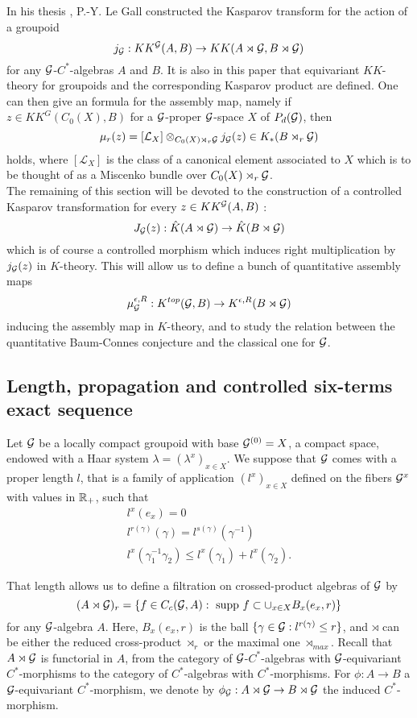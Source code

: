 In his thesis \cite{LeGall}, P.-Y. Le Gall constructed the Kasparov transform for the action of a groupoid
\[j_\mathcal G : KK^\mathcal G(A,B)\rightarrow KK(A\rtimes \mathcal G,B\rtimes \mathcal G)\]
for any $\mathcal G$-$C^*$-algebras $A$ and $B$. It is also in this paper that equivariant $KK$-theory for groupoids and the corresponding Kasparov product are defined. One can then give an formula for the assembly map, namely if $z\in KK^G(C_0(X),B)$ for a $\mathcal G$-proper $\mathcal G$-space $X$ of $P_d(\mathcal G)$, then
\[\mu_r(z)=[\mathcal L_X]\otimes_{C_0(X)\rtimes_r \mathcal G} j_\mathcal G(z) \in K_*(B\rtimes_r \mathcal G) \]
holds, where $[\mathcal L_X]$ is the class of a canonical element associated to $X$ which is to be thought of as a Miscenko bundle over $C_0(X)\rtimes_r \mathcal G$.\\

The remaining of this section will be devoted to the construction of a controlled Kasparov transformation for every $z\in KK^\mathcal G(A,B)$ :
\[J_\mathcal G(z) : \hat K(A\rtimes \mathcal G)\rightarrow \hat K(B\rtimes \mathcal G)\] 
which is of course a controlled morphism which induces right multiplication by $j_\mathcal G(z)$ in $K$-theory. This will allow us to define a bunch of quantitative assembly maps
\[\mu_\mathcal G^{\epsilon, R}: K^{top}(\mathcal G,B)\rightarrow K^{\epsilon,R}(B\rtimes \mathcal G)\]
inducing the assembly map in $K$-theory, and to study the relation between the quantitative Baum-Connes conjecture and the classical one for $\mathcal G$.

\subsection{Length, propagation and controlled six-terms exact sequence}

Let $\mathcal G$ be a locally compact groupoid with base $\mathcal G^{(0)}=X$, a compact space, endowed with a Haar system $\lambda=(\lambda^x)_{x\in X}$. We suppose that $\mathcal G$ comes with a proper length $l$, that is a family of application $(l^x)_{x\in X}$ defined on the fibers $\mathcal G^x$ with values in $\mathbb R_+$, such that
\[\begin{array}{l}
l^x(e_x)=0 \\
l^{r(\gamma)}(\gamma)=l^{s(\gamma)}(\gamma^{-1}) \\
l^x (\gamma_1^{-1} \gamma_2)	\leq l^x(\gamma_1)+l^x(\gamma_2) .	
\end{array}\]

That length allows us to define a filtration on crossed-product algebras of $\mathcal G$ by
\[(A\rtimes \mathcal G)_r = \{f\in C_c(\mathcal G, A) : \text{ supp }f \subset \cup_{x\in X} B_x(e_x, r)\}\]
for any $\mathcal G$-algebra $A$. Here, $B_x(e_x,r)$ is the ball $\{\gamma \in \mathcal G : l^{r(\gamma)}\leq r\}$, and $\rtimes$ can be either the reduced cross-product $\rtimes_r$ or the maximal one $\rtimes_{max}$. Recall that $A\rtimes \mathcal G$ is functorial in $A$, from the category of $\mathcal G$-$C^*$-algebras with $\mathcal G$-equivariant $C^*$-morphisms to the category of $C^*$-algebras with $C^*$-morphisms. For $\phi : A\rightarrow B$ a $\mathcal G$-equivariant $C^*$-morphism, we denote by $\phi_\mathcal G : A\rtimes\mathcal G \rightarrow B\rtimes\mathcal G$ the induced $C^*$-morphism.\\

